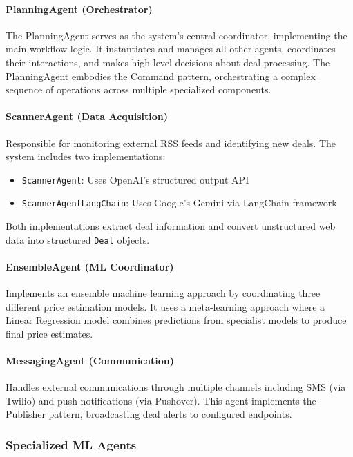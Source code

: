 \paragraph{PlanningAgent (Orchestrator)}
The PlanningAgent serves as the system's central coordinator, implementing the main workflow logic. It instantiates and manages all other agents, coordinates their interactions, and makes high-level decisions about deal processing. The PlanningAgent embodies the Command pattern, orchestrating a complex sequence of operations across multiple specialized components.

\paragraph{ScannerAgent (Data Acquisition)}
Responsible for monitoring external RSS feeds and identifying new deals. The system includes two implementations:
\begin{itemize}
\item \texttt{ScannerAgent}: Uses OpenAI's structured output API
\item \texttt{ScannerAgentLangChain}: Uses Google's Gemini via LangChain framework
\end{itemize}
Both implementations extract deal information and convert unstructured web data into structured \texttt{Deal} objects.

\paragraph{EnsembleAgent (ML Coordinator)}
Implements an ensemble machine learning approach by coordinating three different price estimation models. It uses a meta-learning approach where a Linear Regression model combines predictions from specialist models to produce final price estimates.

\paragraph{MessagingAgent (Communication)}
Handles external communications through multiple channels including SMS (via Twilio) and push notifications (via Pushover). This agent implements the Publisher pattern, broadcasting deal alerts to configured endpoints.

\subsubsection{Specialized ML Agents}

